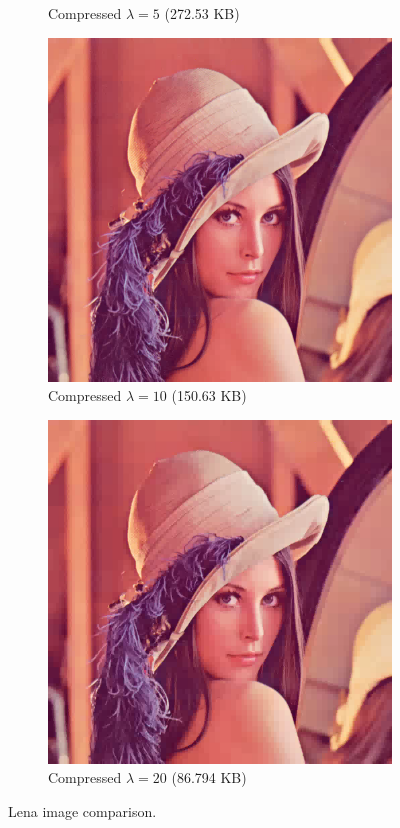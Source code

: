 \documentclass{article}
\theoremstyle{definition}
\begin{document}
\begin{figure}
\begin{subfigure}[t]{.49\linewidth}
      \caption{Compressed \(\lambda = 5\) (272.53 KB)}
    \end{subfigure}
    \begin{subfigure}[t]{.49\linewidth}
      \centering
      \includegraphics[width=.93\linewidth]{figs/lena_haar_10.png}
      \caption{Compressed \(\lambda = 10\) (150.63 KB)}
    \end{subfigure}
    \begin{subfigure}[t]{.49\linewidth}
      \centering
      \includegraphics[width=.93\linewidth]{figs/lena_haar_20.png}
      \caption{Compressed \(\lambda = 20\) (86.794 KB)}
    \end{subfigure}
    \caption{Lena image comparison.}
    \label{fig:lena}
  \end{figure}
\end{document}

